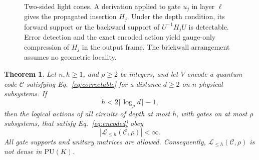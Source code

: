 \documentclass[aps,prl,reprint,notitlepage,nofootinbib,nobibnotes]{revtex4-2}
\newtheorem{theorem}{Theorem}
\newcommand{\PU}{\mathrm{PU}}
\begin{document}
\begin{figure}[t]
{\begin{tikzpicture}
\end{tikzpicture}%
}
\caption{Two-sided light cones. A derivation applied to gate \(u_j\) in layer \(\ell\) gives the propagated
insertion \(H_j\). Under the depth condition, its forward support or
the backward support of \(U^{-1}H_jU\) is detectable.
Error detection and the exact encoded action yield gauge-only
compression of \(H_j\) in the output frame.
The brickwall arrangement assumes no geometric locality.}
\label{fig:mechanisms}
\end{figure}

\begin{samepage}
\begin{theorem}\label{thm:depth}
Let $n,h\ge 1$, and \(\rho\ge2\) be integers, and let
\(V\) encode a quantum code \(\mathcal C\) satisfying Eq.~\eqref{eq:correctable}
for a distance \(d\ge2\) on \(n\) physical subsystems. If
\begin{equation}\label{eq:depth}
  h<2\lceil\log_{\rho} d\rceil-1,
\end{equation}
then the logical actions of all circuits of depth at most \(h\), with gates
on at most \(\rho\) subsystems, that satisfy Eq.~\eqref{eq:encoded} obey
\[
 |\mathcal L_{\le h}(\mathcal C,\rho)|<\infty.
\]
All gate supports and unitary matrices are allowed. Consequently,
\(\mathcal L_{\le h}(\mathcal C,\rho)\) is not dense in \(\PU(K)\).
\end{theorem}
\end{samepage}
\end{document}

